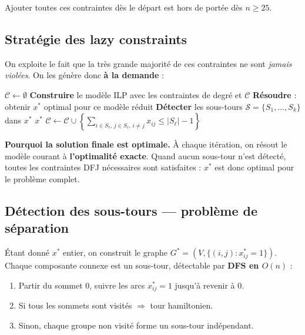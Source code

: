 \documentclass[12pt, a4paper]{article}
\begin{document}
Ajouter toutes ces contraintes dès le départ est hors de portée dès $n \geq 25$.

\subsection{Stratégie des lazy constraints}

On exploite le fait que la très grande majorité de ces contraintes ne sont
\emph{jamais violées}. On les génère donc \textbf{à la demande} :

\begin{algorithm}[H]
\caption{ILP DFJ avec lazy constraints (version itérative)}
\begin{algorithmic}[1]
\State $\mathcal{C} \leftarrow \emptyset$ 
\Repeat
  \State \textbf{Construire} le modèle ILP avec les contraintes de degré et $\mathcal{C}$
  \State \textbf{Résoudre} : obtenir $x^*$ optimal pour ce modèle réduit
  \State \textbf{Détecter} les sous-tours $\mathcal{S} = \{S_1, \ldots, S_k\}$ dans $x^*$
    \State \Return $x^*$ 
  \EndIf
    \State $\mathcal{C} \leftarrow \mathcal{C} \cup \left\{\displaystyle\sum_{i \in S_\ell,\, j \in S_\ell,\, i \neq j} x_{ij} \leq |S_\ell| - 1\right\}$
  \EndFor
{}
\end{algorithmic}
\end{algorithm}

\textbf{Pourquoi la solution finale est optimale.}
À chaque itération, on résout le modèle courant à \textbf{l'optimalité exacte}.
Quand aucun sous-tour n'est détecté, toutes les contraintes DFJ nécessaires sont
satisfaites : $x^*$ est donc optimal pour le problème complet.

\subsection{Détection des sous-tours --- problème de séparation}

Étant donné $x^*$ entier, on construit le graphe $G^* = (V, \{(i,j) : x^*_{ij} = 1\})$.
Chaque composante connexe est un sous-tour, détectable par \textbf{DFS en $O(n)$} :

\begin{enumerate}
  \item Partir du sommet $0$, suivre les arcs $x^*_{ij} = 1$ jusqu'à revenir à $0$.
  \item Si tous les sommets sont visités $\Rightarrow$ tour hamiltonien.
  \item Sinon, chaque groupe non visité forme un sous-tour indépendant.
\end{enumerate}
\end{document}
